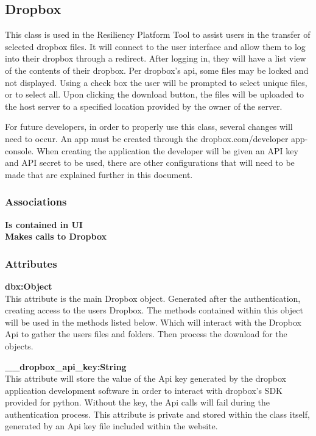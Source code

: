 \subsection{Dropbox}
This class is used in the Resiliency Platform Tool to assist users in the transfer of selected dropbox files.
It will connect to the user interface and allow them to log into their dropbox through a redirect. After logging
in, they will have a list view of the contents of their dropbox. Per dropbox's api, some files may be locked and 
not displayed. Using a check box the user will be prompted to select unique files, or to select all. Upon clicking 
the download button, the files will be uploaded to the host server to a specified location provided by the owner of
the server.

For future developers, in order to properly use this class, several changes will need to occur. An app must be created
through the dropbox.com/developer app-console. When creating the application the developer will be given an API key and 
API secret to be used, there are other configurations that will need to be made that are explained further in this document. 

\subsubsection{Associations}
\textbf{Is contained in UI} \\

\textbf{Makes calls to Dropbox} \\

\subsubsection{Attributes}
\textbf{dbx:Object} \\
    This attribute is the main Dropbox object. Generated after the authentication, creating access to the users Dropbox. The methods contained 
    within this object will be used in the methods listed below. Which will interact with the Dropbox Api to gather the users files and folders.
    Then process the download for the objects. 

\textbf{\_\_dropbox\_api\_key:String} \\
    This attribute will store the value of the Api key generated by the dropbox application development software 
    in order to interact with dropbox's SDK provided for python. Without the key, the Api calls will fail during 
    the authentication process. This attribute is private and stored within the class itself, generated by an Api
    key file included within the website.

